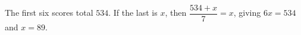 The first six scores total $534$. If the last is $x$, then $\dfrac{534+x}{7}=x$, giving $6x=534$ and $\boxed{x=89}$.
